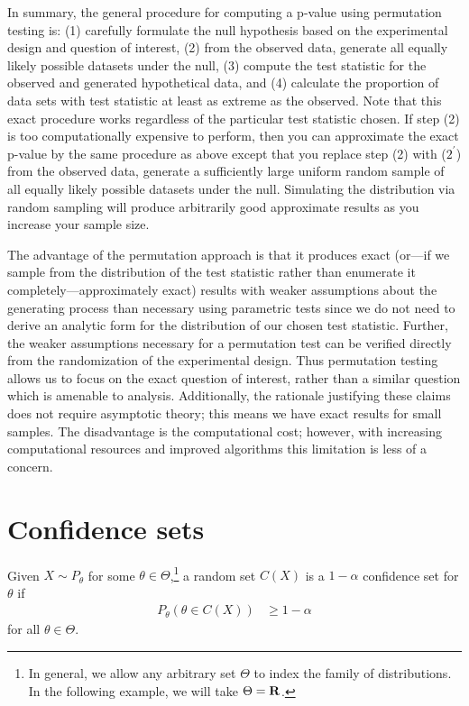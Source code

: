 In summary, the general procedure for computing a p-value using permutation
testing is: (1) carefully formulate the null hypothesis based on the
experimental design and question of interest, (2) from the observed data,
generate all equally likely possible datasets under the null, (3) compute the
test statistic for the observed and generated hypothetical data, and (4)
calculate the proportion of data sets with test statistic at least as extreme
as the observed.  Note that this exact procedure works regardless of the
particular test statistic chosen.  If step (2) is too computationally expensive
to perform, then you can approximate the exact p-value by the same procedure as
above except that you replace step (2) with ($2^\prime$) from the observed
data, generate a sufficiently large uniform random sample of all equally likely
possible datasets under the null. Simulating the distribution via random
sampling will produce arbitrarily good approximate results as you increase your
sample size.

The advantage of the permutation approach is that it produces exact (or---if we
sample from the distribution of the test statistic rather than enumerate it
completely---approximately exact) results with weaker assumptions 
about the generating process than necessary using parametric tests since we do
not need to derive an analytic form for the distribution of our chosen test statistic.
Further, the weaker assumptions necessary for a permutation test can be
verified directly from the randomization of the experimental design.  Thus
permutation testing allows us to focus on the exact question of interest,
rather than a similar question which is amenable to analysis.  Additionally,
the rationale justifying these claims does not require asymptotic theory; this
means we have exact results for small samples.  The disadvantage is the
computational cost; however, with increasing computational resources and
improved algorithms this limitation is less of a concern.

\section{Confidence sets}

Given $X \sim P_\theta$ for some $\theta \in \Theta$,\footnote{In general, we allow any
arbitrary set $\Theta$ to index the family of distributions. In the following example, we will take $\Theta =\mathbf{R}$.} a random set
$C(X)$ is a $1 - \alpha$ confidence set for $\theta$ if
\begin{align*}
P_\theta(\theta \in C(X)) &\ge 1 - \alpha
\end{align*}
for all $\theta \in \Theta$.

